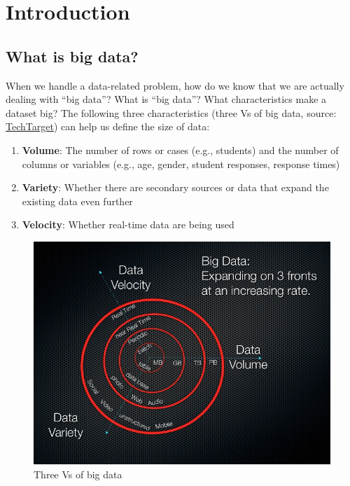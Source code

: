 \documentclass[]{book}
\begin{document}
\hypertarget{intro}{%
\chapter{Introduction}\label{intro}}

\hypertarget{what-is-big-data}{%
\section{What is big data?}\label{what-is-big-data}}

When we handle a data-related problem, how do we know that we are actually dealing with ``big data''? What is ``big data''? What characteristics make a dataset big? The following three characteristics (three Vs of big data, source: \href{https://whatis.techtarget.com/definition/3Vs}{TechTarget}) can help us define the size of data:

\begin{enumerate}
\def\labelenumi{\arabic{enumi}.}
\item
  \textbf{Volume}: The number of rows or cases (e.g., students) and the number of columns or variables (e.g., age, gender, student responses, response times)
\item
  \textbf{Variety}: Whether there are secondary sources or data that expand the existing data even further
\item
  \textbf{Velocity}: Whether real-time data are being used
\end{enumerate}

\begin{figure}
\includegraphics[width=1\linewidth]{images/BigData} \caption{Three Vs of big data}\label{fig:fig1-1}
\end{figure}
\end{document}
